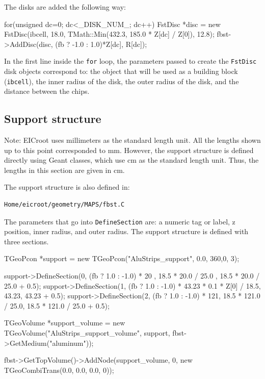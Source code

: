 \documentclass[12pt]{article}
\begin{document}
The disks are added the following way:

\begin{tcolorbox}
\begin{verbnobox}[\scriptsize]
for(unsigned dc=0; dc<_DISK_NUM_; dc++) {
    FstDisc *disc = new FstDisc(ibcell, 18.0, TMath::Min(432.3, 185.0 * Z[dc] / Z[0]), 12.8);
    fbst->AddDisc(disc, (fb ? -1.0 : 1.0)*Z[dc], R[dc]);
}
\end{verbnobox}  
\end{tcolorbox}

In the first line inside the \verb|for| loop, the parameters passed to create the \verb|FstDisc| disk objects correspond to:
the object that will be used as a building block (\verb|ibcell|), the inner radius of the disk, the outer radius of the disk, and the
distance between the chips.

\subsection{Support structure}

\color{red}
Note: EICroot uses millimeters as the standard length unit. All the lengths shown up to this point corresponded to mm.
However, the support structure is defined directly using Geant classes, which use cm as the standard length unit.
Thus, the lengths in this section are given in cm.
\color{black}

The support structure is also defined in:

\begin{tcolorbox}
\begin{verbatim}
Home/eicroot/geometry/MAPS/fbst.C
\end{verbatim}  
\end{tcolorbox}

The parameters that go into \verb|DefineSection| are: a numeric tag or label, z position, inner radius, and outer radius.
The support structure is defined with three sections. 

\begin{tcolorbox}
\begin{verbnobox}[\scriptsize]
TGeoPcon *support = new TGeoPcon("AluStrips_support", 0.0, 360,0, 3);

support->DefineSection(0, (fb ? 1.0 : -1.0) * 20 , 18.5 * 20.0 / 25.0 , 18.5 *  20.0 / 25.0 + 0.5);
support->DefineSection(1, (fb ? 1.0 : -1.0) * 43.23 * 0.1 * Z[0] / 18.5, 43.23, 43.23 + 0.5);
support->DefineSection(2, (fb ? 1.0 : -1.0) * 121, 18.5 * 121.0 / 25.0, 18.5 * 121.0 / 25.0 + 0.5);

TGeoVolume *support_volume = new TGeoVolume("AluStrips_support_volume", support, fbst->GetMedium("aluminum"));

fbst->GetTopVolume()->AddNode(support_volume, 0, new TGeoCombiTrans(0.0, 0.0, 0.0, 0));
\end{verbnobox}  
\end{tcolorbox}
\end{document}
